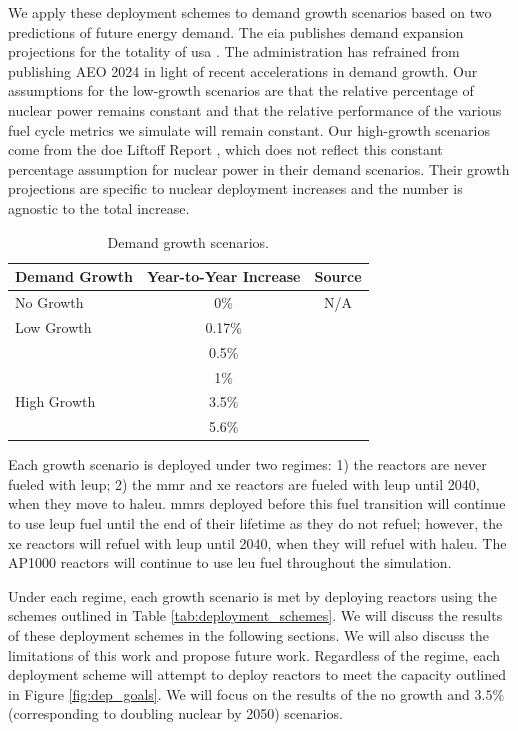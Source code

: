 We apply these deployment schemes to demand growth scenarios based on two
predictions of future energy demand. The \gls{eia} publishes demand expansion
projections for the totality of \gls{usa} \cite{eia_aeo_2023}. The
administration has refrained from publishing AEO 2024 in light of recent
accelerations in demand growth. Our assumptions for the low-growth scenarios
are that the relative percentage of nuclear power remains constant and that the
relative performance of the various fuel cycle metrics we simulate will remain
constant. Our high-growth scenarios come from the \gls{doe} Liftoff Report
\cite{julie_liftoff_pathways_2024}, which does not reflect this constant
percentage assumption for nuclear power in their demand scenarios. Their growth
projections are specific to nuclear deployment increases and the number is
agnostic to the total increase.

\begin{table}[H]
    \centering
    \caption{Demand growth scenarios.}
    \label{tab:demand_scenarios}
    \begin{tabular}{l c c}
        \hline
        \textbf{Demand Growth} & \textbf{Year-to-Year Increase} & \textbf{Source}\\
        \hline
        No Growth & 0\% & N/A\\
        Low Growth & 0.17\% & \cite{eia_aeo_2023}\\
         & 0.5\% & \cite{eia_aeo_2023}\\
         & 1\% & \cite{eia_aeo_2023}\\
        High Growth & 3.5\% & \cite{julie_liftoff_pathways_2024} \\
         & 5.6\% & \cite{julie_liftoff_pathways_2024}\\
        \hline
    \end{tabular}
  \end{table}

Each growth scenario is deployed under two regimes: 1) the reactors are never
fueled with \gls{leup}; 2) the \gls{mmr} and \gls{xe} reactors are fueled with
\gls{leup} until 2040, when they move to \gls{haleu}. \glspl{mmr} deployed
before this fuel transition will continue to use \gls{leup} fuel until the end
of their lifetime as they do not refuel; however, the \gls{xe} reactors will
refuel with \gls{leup} until 2040, when they will refuel with \gls{haleu}. The
AP1000 reactors will continue to use \gls{leu} fuel throughout the simulation.

Under each regime, each growth scenario is met by deploying reactors using the
schemes outlined in Table \ref{tab:deployment_schemes}. We will discuss the
results of these deployment schemes in the following sections. We will also
discuss the limitations of this work and propose future work. Regardless of the
regime, each deployment scheme will attempt to deploy reactors to meet the
capacity outlined in Figure \ref{fig:dep_goals}. We will focus on the results
of the no growth and $3.5\%$ (corresponding to doubling nuclear by 2050)
scenarios.

